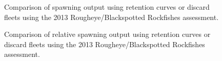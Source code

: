 \documentclass[
]{scrartcl}
\begin{document}
\begin{figure}[H]


\caption{\label{fig-Discard_comp_SO}Comparison of spawning output using
retention curves or discard fleets using the 2013 Rougheye/Blackspotted
Rockfishes assessment.}

\end{figure}%

\begin{figure}[H]


\caption{\label{fig-Discard_comp_RSS}Comparison of relative spawning
output using retention curves or discard fleets using the 2013
Rougheye/Blackspotted Rockfishes assessment.}

\end{figure}%
\end{document}

